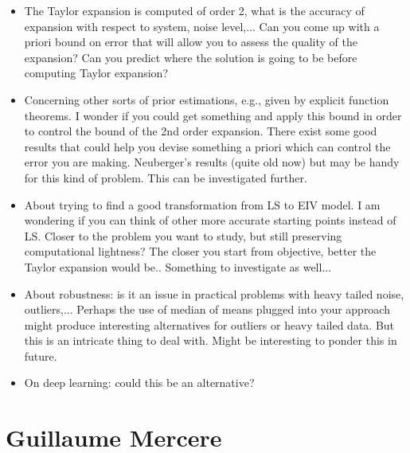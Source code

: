 \documentclass[11pt]{article}
\begin{document}
\begin{itemize}
	\item The Taylor expansion is computed of order 2, what is the accuracy of expansion with respect to system, noise level,... Can you come up with a priori bound on error that will allow you to assess the quality of the expansion? Can you predict where the solution is going to be before computing Taylor expansion?
	
	\item  Concerning other sorts of prior estimations, e.g., given by explicit function theorems. I wonder if you could get something and apply this bound in order to control the bound of the 2nd order expansion. There exist some good results that could help you devise something a priori which can control the error you are making. Neuberger's results (quite old now) but may be handy for this kind of problem. This can be investigated further.
	\item  About trying to find a good transformation from LS to EIV model. I am wondering if you can think of other more accurate starting points instead of LS. Closer to the problem you want to study, but still preserving computational lightness? The closer you start from objective, better the Taylor expansion would be.. Something to investigate as well...
	
	\item  About robustness: is it an issue in practical problems with heavy tailed noise, outliers,... Perhaps the use of median of means plugged into your approach might produce interesting alternatives for outliers or heavy tailed data. But this is an intricate thing to deal with. Might be interesting to ponder this in future.
	
	\item  On deep learning: could this be an alternative?
	
\end{itemize}

\section*{Guillaume Mercere}
\end{document}
